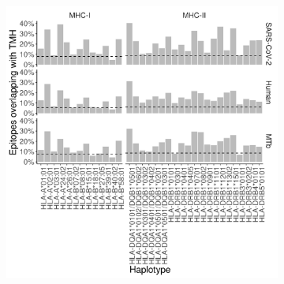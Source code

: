 \begin{figure}[!htbp]
  \centering
  \begin{subfigure}[t]{0.8\textwidth}
    \centering
    \caption{}
    \includegraphics[width=\linewidth]{bbbq_1_smart_results/fig_f_tmh_2_panel_bw.png}
    \label{fig:bbbq_1_smart_results}
  \end{subfigure}

  \vfill


\end{figure}
